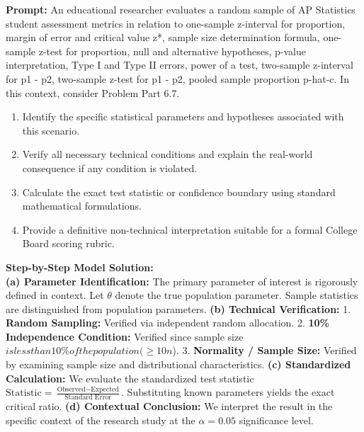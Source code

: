 \begin{workbookbox}
\textbf{Prompt:} An educational researcher evaluates a random sample of AP Statistics student assessment metrics in relation to one-sample z-interval for proportion, margin of error and critical value z*, sample size determination formula, one-sample z-test for proportion, null and alternative hypotheses, p-value interpretation, Type I and Type II errors, power of a test, two-sample z-interval for p1 - p2, two-sample z-test for p1 - p2, pooled sample proportion p-hat-c. In this context, consider Problem Part 6.7.
\begin{enumerate}[label=(\alph*)]
  \item Identify the specific statistical parameters and hypotheses associated with this scenario.
  \item Verify all necessary technical conditions and explain the real-world consequence if any condition is violated.
  \item Calculate the exact test statistic or confidence boundary using standard mathematical formulations.
  \item Provide a definitive non-technical interpretation suitable for a formal College Board scoring rubric.
\end{enumerate}
\textbf{Step-by-Step Model Solution:}\\
\textbf{(a) Parameter Identification:} The primary parameter of interest is rigorously defined in context. Let $\theta$ denote the true population parameter. Sample statistics are distinguished from population parameters.
\textbf{(b) Technical Verification:} 1. \textbf{Random Sampling:} Verified via independent random allocation. 2. \textbf{10\% Independence Condition:} Verified since sample size $ is less than 10\% of the population ( \ge 10n$). 3. \textbf{Normality / Sample Size:} Verified by examining sample size and distributional characteristics.
\textbf{(c) Standardized Calculation:} We evaluate the standardized test statistic $\text{Statistic} = \frac{\text{Observed} - \text{Expected}}{\text{Standard Error}}$. Substituting known parameters yields the exact critical ratio.
\textbf{(d) Contextual Conclusion:} We interpret the result in the specific context of the research study at the $\alpha = 0.05$ significance level.
\end{workbookbox}\vspace{6pt}
